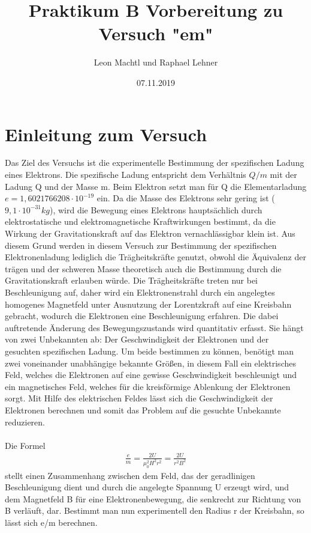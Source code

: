 \documentclass[a4paper,10pt]{scrartcl}
\title{Praktikum B Vorbereitung zu Versuch "em"}
\author{Leon Machtl und Raphael Lehner}
\date{07.11.2019}
\begin{document}
	\maketitle
	\tableofcontents
	\newpage
	
	\section{Einleitung zum Versuch}
	
	Das Ziel des Versuchs ist die experimentelle Bestimmung der spezifischen Ladung eines Elektrons. Die spezifische Ladung entspricht dem Verhältnis $Q/m$ mit der Ladung Q und der Masse m. Beim Elektron setzt man für Q die Elementarladung $e=1,6021766208\cdot 10^{-19}$ ein. Da die Masse des Elektrons sehr gering ist ($9,1 \cdot 10^{-31}kg$), wird die Bewegung eines Elektrons hauptsächlich durch elektrostatische und elektromagnetische Kraftwirkungen bestimmt, da die Wirkung der Gravitationskraft auf das Elektron vernachlässigbar klein ist. Aus diesem Grund werden in diesem Versuch zur Bestimmung der spezifischen Elektronenladung lediglich die Trägheitskräfte genutzt, obwohl die Äquivalenz der trägen und der schweren Masse theoretisch auch die Bestimmung durch die Gravitationskraft erlauben würde. Die Trägheitskräfte treten nur bei Beschleunigung auf, daher wird ein Elektronenstrahl durch ein angelegtes homogenes Magnetfeld unter Ausnutzung der Lorentzkraft auf eine Kreisbahn gebracht, wodurch die Elektronen eine Beschleunigung erfahren. Die dabei auftretende Änderung des Bewegungszustands wird quantitativ erfasst. Sie hängt von zwei Unbekannten ab: Der Geschwindigkeit der Elektronen und der gesuchten spezifischen Ladung. Um beide bestimmen zu können, benötigt man zwei voneinander unabhängige bekannte Größen, in diesem Fall ein elektrisches Feld, welches die Elektronen auf eine gewisse Geschwindigkeit beschleunigt und ein magnetisches Feld, welches für die kreisförmige Ablenkung der Elektronen sorgt. Mit Hilfe des elektrischen Feldes lässt sich die Geschwindigkeit der Elektronen berechnen und somit das Problem auf die gesuchte Unbekannte reduzieren.\\
	\\
	Die Formel 
	\begin{align}
	\frac{e}{m}=\frac{2U}{\mu_{0}^2H^2r^2}=\frac{2U}{r^2B^2}
	\end{align}
	stellt einen Zusammenhang zwischen dem Feld, das der geradlinigen Beschleunigung dient und durch die angelegte Spannung U erzeugt wird, und dem Magnetfeld B für eine Elektronenbewegung, die senkrecht zur Richtung von B verläuft, dar. Bestimmt man nun experimentell den Radius r der Kreisbahn, so lässt sich e/m berechnen.
	
\end{document}
